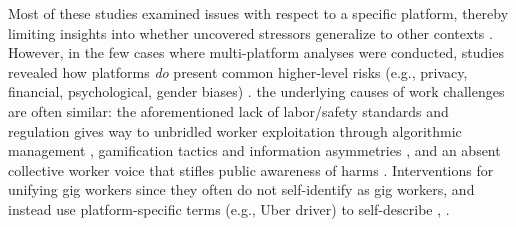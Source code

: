 Most of these studies examined issues with respect to a specific platform, thereby limiting insights into whether uncovered stressors generalize to other contexts . However, in the few cases where multi-platform analyses were conducted, studies revealed how platforms \textit{do} present common higher-level risks (e.g., privacy, financial, psychological, gender biases) \cite{privacy, toward, brush}.  the underlying causes of work challenges are often similar: the aforementioned lack of labor/safety standards and regulation gives way to unbridled worker exploitation through algorithmic management \cite{dubal2023algorithmic, machines, excessive}, gamification tactics and information asymmetries \cite{algorithmic, locus, zhang2022algorithmic}, and an absent collective worker voice that stifles public awareness of harms \cite{ming2024wage, cole2024wage, lastmile}.  Interventions for unifying gig workers  since they often do not self-identify as gig workers, and instead use platform-specific terms (e.g., Uber driver) to self-describe \cite{supporting},  \cite{ming2024wage, cole2024wage, lastmile}. 
